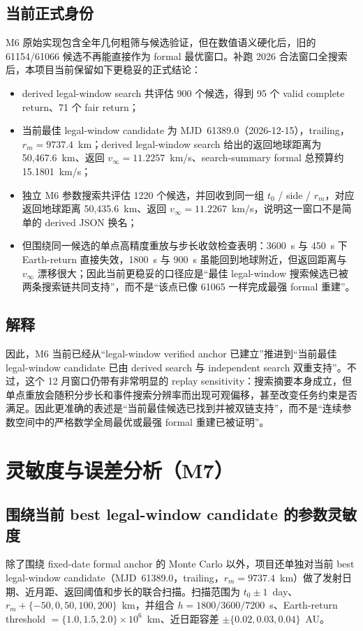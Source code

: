 \documentclass[12pt,a4paper]{ctexart}
\begin{document}
\subsection{当前正式身份}
M6 原始实现包含全年几何粗筛与候选验证，但在数值语义硬化后，旧的 61154/61066 候选不再能直接作为 formal 最优窗口。补跑 2026 合法窗口全搜索后，本项目当前保留如下更稳妥的正式结论：
\begin{itemize}
    \item derived legal-window search 共评估 900 个候选，得到 95 个 valid complete return、71 个 fair return；
    \item 当前最佳 legal-window candidate 为 MJD~61389.0（2026-12-15），trailing，$r_m=9737.4$~km；derived legal-window search 给出的返回地球距离为 50,467.6~km、返回 $v_{\infty}=11.2257$~km/s、search-summary formal 总预算约 15.1801~km/s；
    \item 独立 M6 参数搜索共评估 1220 个候选，并回收到同一组 $t_0$ / side / $r_m$，对应返回地球距离 50,435.6~km、返回 $v_{\infty}=11.2267$~km/s，说明这一窗口不是简单的 derived JSON 换名；
    \item 但围绕同一候选的单点高精度重放与步长收敛检查表明：3600~s 与 450~s 下 Earth-return 直接失效，1800~s 与 900~s 虽能回到地球附近，但返回距离与 $v_{\infty}$ 漂移很大；因此当前更稳妥的口径应是“最佳 legal-window 搜索候选已被两条搜索链共同支持”，而不是“该点已像 61065 一样完成最强 formal 重建”。
\end{itemize}

\subsection{解释}
因此，M6 当前已经从“legal-window verified anchor 已建立”推进到“当前最佳 legal-window candidate 已由 derived search 与 independent search 双重支持”。不过，这个 12 月窗口仍带有非常明显的 replay sensitivity：搜索摘要本身成立，但单点重放会随积分步长和事件搜索分辨率而出现可观偏移，甚至改变任务约束是否满足。因此更准确的表述是“当前最佳候选已找到并被双链支持”，而不是“连续参数空间中的严格数学全局最优或最强 formal 重建已被证明”。

\section{灵敏度与误差分析（M7）}
\subsection{围绕当前 best legal-window candidate 的参数灵敏度}
除了围绕 fixed-date formal anchor 的 Monte Carlo 以外，项目还单独对当前 best legal-window candidate（MJD~61389.0，trailing，$r_m=9737.4$~km）做了发射日期、近月距、返回阈值和步长的联合扫描。扫描范围为 $t_0\pm1$~day、$r_m+\{-50,0,50,100,200\}$~km，并组合 $h=1800/3600/7200$~s、Earth-return threshold $=\{1.0,1.5,2.0\}\times10^6$~km、近日距容差 $\pm\{0.02,0.03,0.04\}$~AU。
\end{document}
